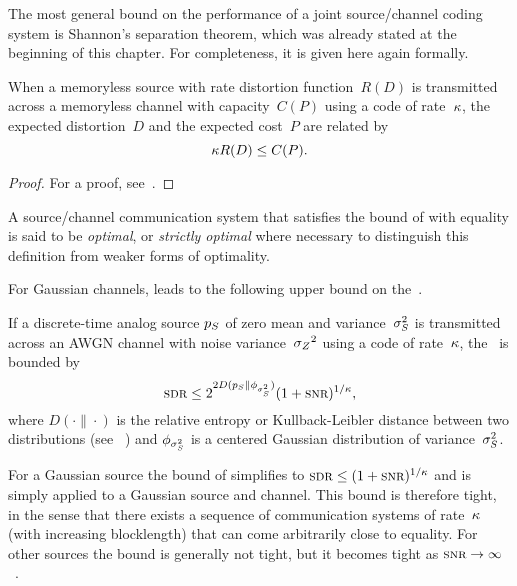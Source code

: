 The most general bound on the performance of a joint source/channel coding
system is Shannon's separation theorem, which was already stated at the
beginning of this chapter.  For completeness, it is given here again formally.

\begin{theorem}
  \label{thm:sepconverse}
  When a memoryless source with rate distortion function~$R(D)$ is transmitted
  across a memoryless channel with capacity~$C(P)$ using a code of rate~$\kappa$,
  the expected distortion~$D$ and the expected cost~$P$ are related by
  \begin{equation}
    \label{eq:sepconverse}
    \kappa R(D) \le C(P).
  \end{equation}
\end{theorem}

\begin{proof}
  For a proof, see~\cite[Theorem~9.6.1]{Gallager1968}.
\end{proof}

\begin{definition}
  \label{def:optimalcode}
  A source/channel communication system that satisfies the bound of
   with equality is said to be \emph{optimal}, or
  \emph{strictly optimal} where necessary to distinguish this definition from
  weaker forms of optimality.
\end{definition}

For Gaussian channels,  leads to the following upper bound
on the~\sdr.
\begin{theorem}
  \label{thm:sdrub}
  If a discrete-time analog source ${p_S}$ of zero mean and variance~${\sigma_S^2}$ is
  transmitted across an AWGN channel with noise variance~${{\sigma_Z}^2}$ using a code of
  rate~$\kappa$, the \sdr\ is bounded by
  \begin{equation}
    \label{eq:sdrub}
    \sdr \le 2^{2 D(\pS \| \phi_{\ssq})} (1 + \snr)^{1/\k},
  \end{equation}
  where $D(\cdot \| \cdot)$ is the relative entropy or Kullback-Leibler distance
  between two distributions (see \eg~\cite{CoverT1991}) and $\phi_{{\sigma_S^2}}$ is a
  centered Gaussian distribution of variance~${\sigma_S^2}$.
\end{theorem}

\begin{remark}
  \label{rem:perflimitgaussiansource}
  For a Gaussian source the bound of  simplifies to $\sdr \le (1 +
  \snr)^{1/\k}$ and is simply  applied to a Gaussian
  source and channel. This bound is therefore tight, in the sense that there
  exists a sequence of communication systems of rate~$\kappa$ (with increasing
  blocklength) that can come arbitrarily close to equality. 
  For other sources the bound is generally not tight, but it becomes tight as
  $\snr \ra \infty$~\cite{LinderZ1994}.
\end{remark}

